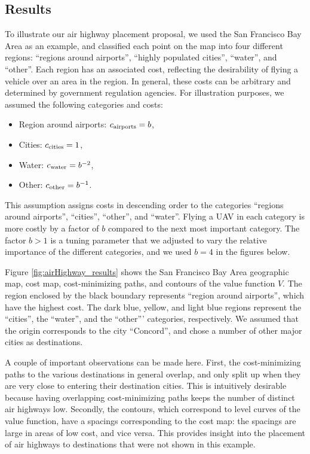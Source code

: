 \subsection{Results}
To illustrate our air highway placement proposal, we used the San Francisco Bay Area as an example, and classified each point on the map into four different regions: ``regions around airports'', ``highly populated cities'', ``water'', and ``other''. Each region has an associated cost, reflecting the desirability of flying a vehicle over an area in the region. In general, these costs can be arbitrary and determined by government regulation agencies. For illustration purposes, we assumed the following categories and costs:

\begin{itemize}
\item Region around airports: $c_\text{airports}=b$,
\item Cities: $c_\text{cities}=1$,
\item Water: $c_\text{water}=b^{-2}$,
\item Other: $c_\text{other}=b^{-1}$.
\end{itemize}

This assumption assigns costs in descending order to the categories ``regions around airports'', ``cities'', ``other'', and ``water''. Flying a UAV in each category is more costly by a factor of $b$ compared to the next most important category. The factor $b>1$ is a tuning parameter that we adjusted to vary the relative importance of the different categories, and we used $b=4$ in the figures below.

Figure \ref{fig:airHighway_results} shows the San Francisco Bay Area geographic map, cost map, cost-minimizing paths, and contours of the value function $V$. The region enclosed by the black boundary represents ``region around airports'', which have the highest cost. The dark blue, yellow, and light blue regions represent the ``cities'', the ``water'', and the ``other''' categories, respectively. We assumed that the origin corresponds to the city ``Concord'', and chose a number of other major cities as destinations.

A couple of important observations can be made here. First, the cost-minimizing paths to the various destinations in general overlap, and only split up when they are very close to entering their destination cities. This is intuitively desirable because having overlapping cost-minimizing paths keeps the number of distinct air highways low. Secondly, the contours, which correspond to level curves of the value function, have a spacings corresponding to the cost map: the spacings are large in areas of low cost, and vice versa. This provides insight into the placement of air highways to destinations that were not shown in this example.

